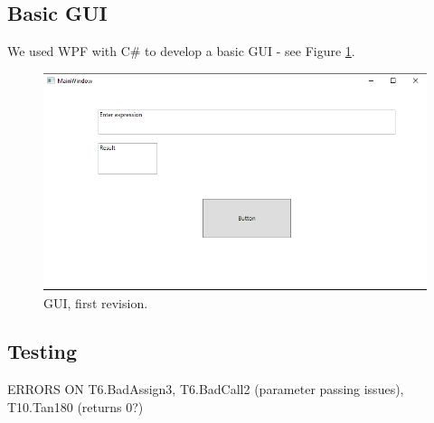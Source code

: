 \documentclass[a4paper, oneside, 11pt]{report}
\begin{document}
    \subsection{Basic GUI}
    We used WPF with C\# to develop a basic GUI - see Figure \ref{gui01}.
    \begin{figure}[htb]
        \begin{center}

            \includegraphics[width=0.9 \columnwidth]{GUI_01}

            \caption{GUI, first revision.}
            \label{gui01}
        \end{center}
    \end{figure}

    \subsection{Testing}
    ERRORS ON T6.BadAssign3, T6.BadCall2 (parameter passing issues), T10.Tan180 (returns 0?)

    \clearpage

\end{document}
